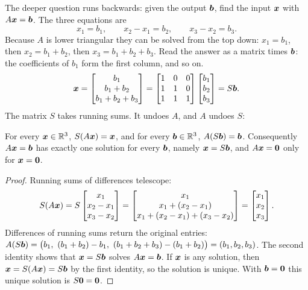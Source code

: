 The deeper question runs backwards: given the output $\boldsymbol{b}$, find the input $\boldsymbol{x}$ with
$A\boldsymbol{x}=\boldsymbol{b}$. The three equations are
\[
  x_1=b_1,\qquad x_2-x_1=b_2,\qquad x_3-x_2=b_3 .
\]
Because $A$ is lower triangular they can be solved from the top down: $x_1=b_1$, then
$x_2=b_1+b_2$, then $x_3=b_1+b_2+b_3$. Read the answer as a matrix times $\boldsymbol{b}$: the
coefficients of $b_1$ form the first column, and so on.
\begin{equation}\label{eq:u02-S}
  \boldsymbol{x}=\begin{bmatrix} b_1\\ b_1+b_2\\ b_1+b_2+b_3\end{bmatrix}
  =\begin{bmatrix} 1 & 0 & 0\\ 1 & 1 & 0\\ 1 & 1 & 1\end{bmatrix}
  \begin{bmatrix} b_1\\ b_2\\ b_3\end{bmatrix} = S\boldsymbol{b}.
\end{equation}
The matrix $S$ takes running sums. It undoes $A$, and $A$ undoes $S$:

\begin{proposition}\label{prop:u02-sum}
For every $\boldsymbol{x}\in\mathbb{R}^3$, $S(A\boldsymbol{x})=\boldsymbol{x}$, and for every $\boldsymbol{b}\in\mathbb{R}^3$,
$A(S\boldsymbol{b})=\boldsymbol{b}$. Consequently $A\boldsymbol{x}=\boldsymbol{b}$ has exactly one solution for every
$\boldsymbol{b}$, namely $\boldsymbol{x}=S\boldsymbol{b}$, and $A\boldsymbol{x}=\boldsymbol{0}$ only for $\boldsymbol{x}=\boldsymbol{0}$.
\end{proposition}

\begin{proof}
Running sums of differences telescope:
\[
  S(A\boldsymbol{x}) = S\begin{bmatrix} x_1\\ x_2-x_1\\ x_3-x_2\end{bmatrix}
  = \begin{bmatrix} x_1\\ x_1+(x_2-x_1)\\ x_1+(x_2-x_1)+(x_3-x_2)\end{bmatrix}
  = \begin{bmatrix} x_1\\ x_2\\ x_3\end{bmatrix}.
\]
Differences of running sums return the original entries:
$A(S\vb{b}) = \bigl(b_1,\ (b_1+b_2)-b_1,\ (b_1+b_2+b_3)-(b_1+b_2)\bigr)=(b_1,b_2,b_3)$.
The second identity shows that $\boldsymbol{x}=S\boldsymbol{b}$ solves $A\boldsymbol{x}=\boldsymbol{b}$. If $\boldsymbol{x}$ is any
solution, then $\boldsymbol{x}=S(A\boldsymbol{x})=S\boldsymbol{b}$ by the first identity, so the solution is unique.
With $\boldsymbol{b}=\boldsymbol{0}$ this unique solution is $S\boldsymbol{0}=\boldsymbol{0}$.
\end{proof}

